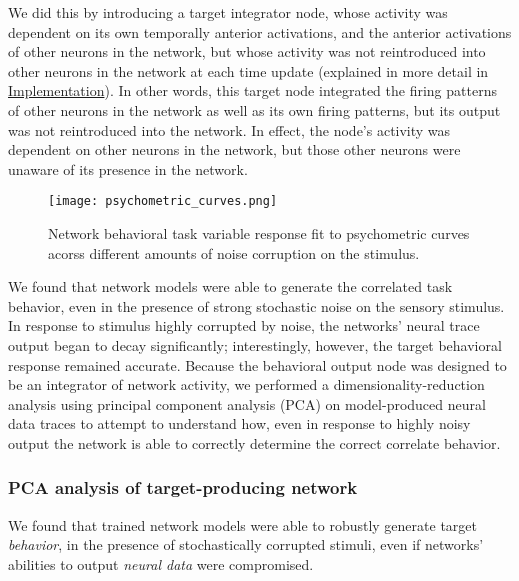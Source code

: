 \documentclass[12pt,a4paper,final]{iopart}
\begin{document}
We did this by introducing a target integrator node, whose activity was dependent on its own temporally anterior activations, and the anterior activations of other neurons in the network, but whose activity was not reintroduced into other neurons in the network at each time update (explained in more detail in \hyperref[sec:imp]{Implementation}). In other words, this target node integrated the firing patterns of other neurons in the network as well as its own firing patterns, but its output was not reintroduced into the network. In effect, the node's activity was dependent on other neurons in the network, but those other neurons were unaware of its presence in the network.
\begin{figure}
    \centering
    \texttt{[image: psychometric\_curves.png]}
    \caption{Network behavioral task variable response fit to psychometric curves acorss different amounts of noise corruption on the stimulus.}
    \label{fig:my_label}
\end{figure}

We found that network models were able to generate the correlated task behavior, even in the presence of strong stochastic noise on the sensory stimulus. In response to stimulus highly corrupted by noise, the networks' neural trace output began to decay significantly; interestingly, however, the target behavioral response remained accurate. Because the behavioral output node was designed to be an integrator of network activity, we performed a dimensionality-reduction analysis using principal component analysis (PCA) on model-produced neural data traces to attempt to understand how, even in response to highly noisy output the network is able to correctly determine the correct correlate behavior. 

\subsubsection{PCA analysis of target-producing network}
We found that trained network models were able to robustly generate target \emph{behavior}, in the presence of stochastically corrupted stimuli, even if networks' abilities to output \emph{neural data} were compromised.
\end{document}
